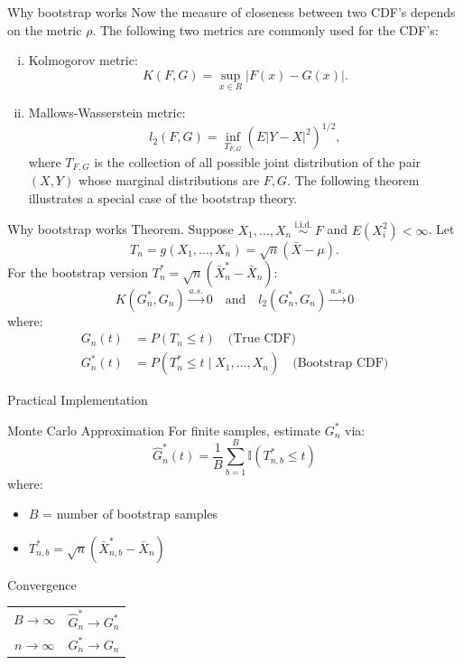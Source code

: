 \documentclass[
  ignorenonframetext,
]{beamer}
\begin{document}
\begin{frame}{Why bootstrap works}
\protect{}\label{why-bootstrap-works-1}
Now the measure of closeness between two CDF's depends on the metric
\(\rho\). The following two metrics are commonly used for the CDF's:

\begin{enumerate}
[(i)]
\item
  Kolmogorov metric: \[
  K(F, G)=\sup _{x \in R}|F(x)-G(x)| .
  \]
\item
  Mallows-Wasserstein metric: \[
  l_2(F, G)=\inf _{T_{F, G}}\left(E|Y-X|^2\right)^{1 / 2},
  \] where \(T_{F, G}\) is the collection of all possible joint
  distribution of the pair \((X, Y)\) whose marginal distributions are
  \(F, G\). The following theorem illustrates a special case of the
  bootstrap theory.
\end{enumerate}
\end{frame}

\begin{frame}{Why bootstrap works}
\protect{}\label{why-bootstrap-works-2}
Theorem. Suppose
\(X_1, \ldots, X_n \stackrel{\text { i.i.d. }}{\sim} F\) and
\(E\left(X_i^2\right)<\infty\). Let \[
T_n=g\left(X_1, \ldots, X_n\right)=\sqrt{n}(\bar{X}-\mu).
\] For the bootstrap version
\(T_n^* = \sqrt{n}(\bar{X}_n^* - \bar{X}_n)\): \[
K(G_n^*, G_n) \xrightarrow{a.s.} 0 \quad \text{and} \quad l_2(G_n^*, G_n) \xrightarrow{a.s.} 0
\] where: \begin{align*}
G_n(t) &= P(T_n \leq t) \quad \text{(True CDF)} \\
G_n^*(t) &= P(T_n^* \leq t \mid X_1, \dots, X_n) \quad \text{(Bootstrap CDF)}
\end{align*}
\end{frame}

\begin{frame}{Practical Implementation}
\protect{}\label{practical-implementation}
\begin{block}{Monte Carlo Approximation}
For finite samples, estimate $G_n^*$ via:
\[
\hat{G}_n^*(t) = \frac{1}{B}\sum_{b=1}^B \mathbb{I}(T_{n,b}^* \leq t)
\]
where:
\begin{itemize}
\item $B$ = number of bootstrap samples
\item $T_{n,b}^* = \sqrt{n}(\bar{X}_{n,b}^* - \bar{X}_n)$
\end{itemize}
\end{block}

\begin{exampleblock}{Convergence}
\begin{center}
\begin{tabular}{cc}
$B \to \infty$ & $\hat{G}_n^* \to G_n^*$ \\
$n \to \infty$ & $G_n^* \to G_n$ \\
\end{tabular}
\end{center}
\end{exampleblock}
\end{frame}
\end{document}
